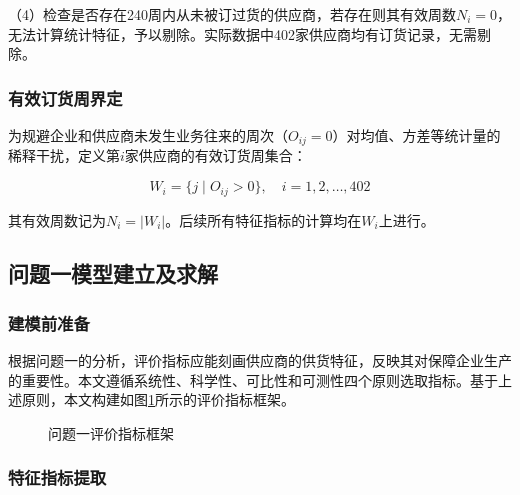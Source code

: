 \documentclass[12pt,a4paper]{ctexart}
\theoremstyle{definition}
\theoremstyle{plain}
\theoremstyle{remark}
\begin{document}
（4）检查是否存在240周内从未被订过货的供应商，若存在则其有效周数$N_i = 0$，无法计算统计特征，予以剔除。实际数据中402家供应商均有订货记录，无需剔除。

\subsubsection{有效订货周界定}

为规避企业和供应商未发生业务往来的周次（$O_{ij} = 0$）对均值、方差等统计量的稀释干扰，定义第$i$家供应商的有效订货周集合：

\begin{equation}
W_i = \{j \mid O_{ij} > 0\}, \quad i = 1, 2, \dots, 402
\end{equation}

其有效周数记为$N_i = |W_i|$。后续所有特征指标的计算均在$W_i$上进行。

\subsection{问题一模型建立及求解}

\subsubsection{建模前准备}


根据问题一的分析，评价指标应能刻画供应商的供货特征，反映其对保障企业生产的重要性。本文遵循系统性、科学性、可比性和可测性四个原则选取指标。基于上述原则，本文构建如图\ref{fig:framework}所示的评价指标框架。

\begin{figure}[H]
\centering
{}
\caption{问题一评价指标框架}
\label{fig:framework}
\end{figure}

\subsubsection{特征指标提取}
\end{document}
